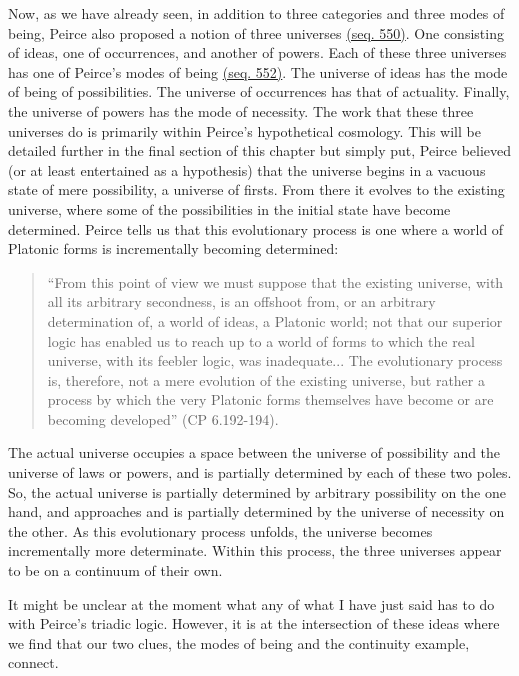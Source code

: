 Now, as we have already seen, in addition to three categories and three modes of being, Peirce also proposed a notion of three universes \href{https://iiif.lib.harvard.edu/manifests/view/drs:15255301$550i}{(seq. 550)}. One consisting of ideas, one of occurrences, and another of powers. Each of these three universes has one of Peirce's modes of being \href{https://iiif.lib.harvard.edu/manifests/view/drs:15255301$552i}{(seq. 552)}. The universe of ideas has the mode of being of possibilities. The universe of occurrences has that of actuality. Finally, the universe of powers has the mode of necessity. The work that these three universes do is primarily within Peirce's hypothetical cosmology. This will be detailed further in the final section of this chapter but simply put, Peirce believed (or at least entertained as a hypothesis) that the universe begins in a vacuous state of mere possibility, a universe of firsts. From there it evolves to the existing universe, where some of the possibilities in the initial state have become determined. Peirce tells us that this evolutionary process is one where a world of Platonic forms is incrementally becoming determined: \begin{quotation}\noindent``From this point of view we must suppose that the existing universe, with all its arbitrary secondness, is an offshoot from, or an arbitrary determination of, a world of ideas, a Platonic world; not that our superior logic has enabled us to reach up to a world of forms to which the real universe, with its feebler logic, was inadequate... The evolutionary process is, therefore, not a mere evolution of the existing universe, but rather a process by which the very Platonic forms themselves have become or are becoming developed'' (CP 6.192-194).
\end{quotation} The actual universe occupies a space between the universe of possibility and the universe of laws or powers, and is partially determined by each of these two poles. So, the actual universe is partially determined by arbitrary possibility on the one hand, and approaches and is partially determined by the universe of necessity on the other. As this evolutionary process unfolds, the universe becomes incrementally more determinate. Within this process, the three universes appear to be on a continuum of their own.

It might be unclear at the moment what any of what I have just said has to do with Peirce's triadic logic. However, it is at the intersection of these ideas where we find that our two clues, the modes of being and the continuity example, connect.

